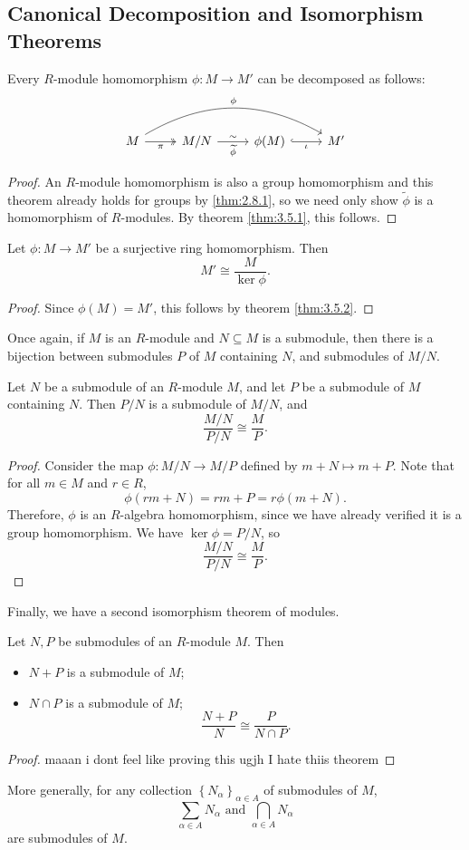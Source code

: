 \subsection{Canonical Decomposition and Isomorphism Theorems}
\begin{theorem}\label{thm:3.5.2}
	Every $R$-module homomorphism $\phi : M \to M'$ can be decomposed as follows:
	\[\begin{tikzcd}[row sep=1.5em, column sep=2.5em]
		M \arrow[rrr, bend left, "\phi "]\arrow[r, two heads, "\pi "']&M /N\arrow[r, "\sim ", "\widetilde{\phi}"']&\phi (M)\arrow[r, hook, "\iota"']&M'
	\end{tikzcd}\]
\end{theorem}
\begin{proof}
	An $R$-module homomorphism is also a group homomorphism and this theorem already holds for groups by \ref{thm:2.8.1}, so we need only show $\widetilde{\phi} $ is a homomorphism of $R$-modules. By theorem \ref{thm:3.5.1}, this follows.
\end{proof}
\begin{corollary}\label{cor:3.5.1}
	Let $\phi : M \to M'$ be a surjective ring homomorphism. Then
	\[
		M' \cong \frac{M}{\ker \phi }
	.\]
\end{corollary}
\begin{proof}
	Since $\phi (M)=M'$, this follows by theorem \ref{thm:3.5.2}.
\end{proof}

Once again, if $M$ is an $R$-module and $N\subseteq M$ is a submodule, then there is a bijection between submodules $P$ of $M$ containing $N$, and submodules of $M /N$.
\begin{proposition}\label{prp:3.5.2}
	Let $N$ be a submodule of an $R$-module $M$, and let $P$ be a submodule of $M$ containing $N$. Then $P /N$ is a submodule of $M /N$, and
	\[
		\frac{M /N}{P /N}\cong \frac{M}{P}
	.\]
\end{proposition}
\begin{proof}
	Consider the map $\phi : M/N \to M /P$ defined by $m+N\mapsto m+P$. Note that for all $m\in M$ and $r\in R$,
	\[
		\phi (rm+N)=rm+P=r\phi (m+N)
	.\]
	Therefore, $\phi $ is an $R$-algebra homomorphism, since we have already verified it is a group homomorphism. We have $\ker \phi =P /N$, so
	\[
		\frac{M /N}{P /N}\cong \frac{M}{P}
	.\]
\end{proof}

Finally, we have a second isomorphism theorem of modules.
\begin{proposition}\label{prp:3.5.3}
	Let $N,P$ be submodules of an $R$-module $M$. Then
	\begin{itemize}
		\item $N+P$ is a submodule of $M$;
		\item $N\cap P$ is a submodule of $M$;
			\[
				\frac{N+P}{N}\cong \frac{P}{N\cap P}
			.\]
	\end{itemize}
\end{proposition}
\begin{proof}
	maaan i dont feel like proving this ugjh I hate thiis theorem
\end{proof}

More generally, for any collection $\left\{ N_{\alpha } \right\}_{\alpha \in A}$ of submodules of $M$,
\[
	\sum_{\alpha \in A} N_\alpha \text{ and } \bigcap_{\alpha\in A} N_\alpha  
\]
are submodules of $M$.
